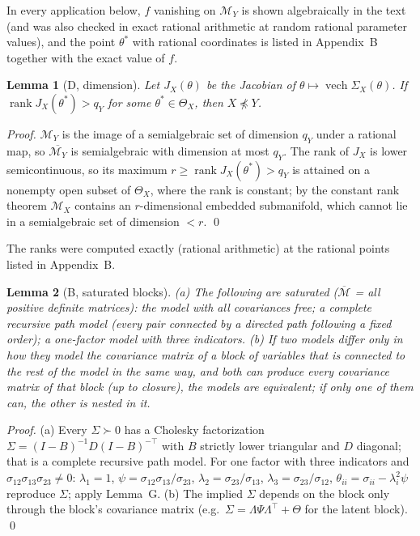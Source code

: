 \documentclass[10pt,a4paper]{article}
\newcommand{\nnest}{\not\preceq}
\newtheorem*{lemma}{Lemma}
\begin{document}
In every application below, $f$ vanishing on $\mathcal M_Y$ is shown algebraically in the text (and was also checked in exact rational arithmetic at random rational parameter values), and the point $\theta^*$ with rational coordinates is listed in Appendix~B together with the exact value of $f$.

\begin{lemma}[D, dimension]
Let $J_X(\theta)$ be the Jacobian of $\theta\mapsto\operatorname{vech}\Sigma_X(\theta)$. If $\operatorname{rank}J_X(\theta^*)>q_Y$ for some $\theta^*\in\Theta_X$, then $X\nnest Y$.
\end{lemma}
\emph{Proof.} $\mathcal M_Y$ is the image of a semialgebraic set of dimension $q_Y$ under a rational map, so $\overline{\mathcal M_Y}$ is semialgebraic with dimension at most $q_Y$. The rank of $J_X$ is lower semicontinuous, so its maximum $r\ge\operatorname{rank}J_X(\theta^*)>q_Y$ is attained on a nonempty open subset of $\Theta_X$, where the rank is constant; by the constant rank theorem $\mathcal M_X$ contains an $r$-dimensional embedded submanifold, which cannot lie in a semialgebraic set of dimension $<r$. \qed

The ranks were computed exactly (rational arithmetic) at the rational points listed in Appendix~B.

\begin{lemma}[B, saturated blocks]
(a) The following are saturated ($\overline{\mathcal M}$ = all positive definite matrices): the model with all covariances free; a complete recursive path model (every pair connected by a directed path following a fixed order); a one-factor model with three indicators. (b) If two models differ only in how they model the covariance matrix of a block of variables that is connected to the rest of the model in the same way, and both can produce every covariance matrix of that block (up to closure), the models are equivalent; if only one of them can, the other is nested in it.
\end{lemma}
\emph{Proof.} (a) Every $\Sigma\succ0$ has a Cholesky factorization $\Sigma=(I-B)^{-1}D(I-B)^{-\top}$ with $B$ strictly lower triangular and $D$ diagonal; that is a complete recursive path model. For one factor with three indicators and $\sigma_{12}\sigma_{13}\sigma_{23}\neq0$: $\lambda_1=1$, $\psi=\sigma_{12}\sigma_{13}/\sigma_{23}$, $\lambda_2=\sigma_{23}/\sigma_{13}$, $\lambda_3=\sigma_{23}/\sigma_{12}$, $\theta_{ii}=\sigma_{ii}-\lambda_i^2\psi$ reproduce $\Sigma$; apply Lemma~G. (b) The implied $\Sigma$ depends on the block only through the block's covariance matrix (e.g.\ $\Sigma=\Lambda\Psi\Lambda^\top+\Theta$ for the latent block). \qed
\end{document}
